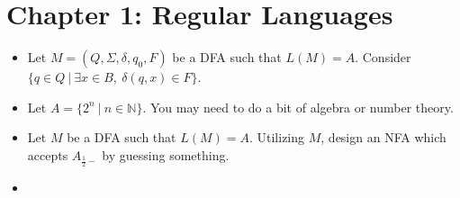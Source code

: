 \section{Chapter 1: Regular Languages}

\begin{itemize}
	
	
	\item[\hard 1.45]
	\begin{comment}
	Let $A/B = \{w \ | \ wx \in A \text{ for some } x \in B \}$. Show that if $A$ is regular and $B$ is any language, then $A/B$ is regular. 
	
	\hint
	\end{comment}
	Let $M = (Q, \Sigma, \delta, q_0, F)$ be a DFA such that $L(M) = A$. Consider $ \{ q \in Q \ | \ \exists x \in B,\ \delta(q, x) \in F \} $.
	
	
	\item[\hard 1.56]
	\begin{comment}
	If $A$ is a set of natural numbers and $k$ is a natural number greater than $1$, let
	\[
		B_k(A) = \{ w \ | \ w \text{ is the representation in base $k$ of some number in $A$} \}.
	\]
	Here, we do not allow leading $\mathtt{0}$s in the representation of a number. For example, $B_2(\{3, 5\}) = \{ \mathtt{11}, \mathtt{101} \}$ and $B_3(\{3, 5\}) = \{ \mathtt{10}, \mathtt{12} \}$. Give an example of a set $A$ for which $B_2(A)$ is regular but $B_3(A)$ is not regular. Prove that your example works.
	
	\hint
	\end{comment}
	Let $A = \{2^n \ | \ n \in \mathbb{N} \}$. You may need to do a bit of algebra or number theory.
	
	
	\item[\hard 1.57] 
	\begin{comment}
	If $A$ is any language, let $A_{\frac{1}{2}-}$ be the set of all first halves of strings in $A$ so that
	\[
		A_{\frac{1}{2}-} = \{ x \ | \ \text{for some $y$, $|x| = |y|$ and $xy \in A$} \}.
	\]
	Show that if $A$ is regular, then so is $A_{\frac{1}{2}-}$.
	
	\hint
	\end{comment}
	Let $M$ be a DFA such that $L(M) = A$. Utilizing $M$, design an NFA which accepts $A_{\frac{1}{2}-}$ by guessing something.
	
	
	\item[\hard 1.58] 
	\begin{comment}
	If $A$ is any language, let $A_{\frac{1}{3}-\frac{1}{3}}$ be the set of all strings in $A$ with their middle thirds removed so that	
	\[
		A_{\frac{1}{3}-\frac{1}{3}} = \{ xz \ | \ \text{for some $y$, $|x| = |y| = |z|$ and $xyz \in A$} \}.
	\]
	Show that if $A$ is regular, then $A_{\frac{1}{3}-\frac{1}{3}}$ is not necessarily regular
	

\end{comment}
\end{itemize}
